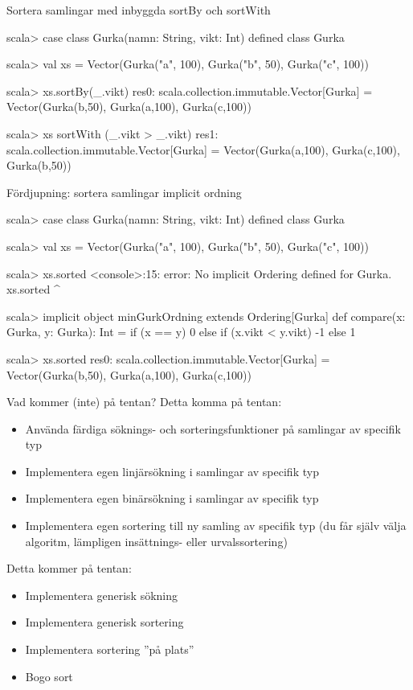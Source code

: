 \begin{Slide}{Sortera samlingar med inbyggda sortBy och sortWith}
\begin{REPL}
scala> case class Gurka(namn: String, vikt: Int)
defined class Gurka

scala> val xs = Vector(Gurka("a", 100), Gurka("b", 50), Gurka("c", 100))

scala> xs.sortBy(_.vikt)
res0: scala.collection.immutable.Vector[Gurka] = 
        Vector(Gurka(b,50), Gurka(a,100), Gurka(c,100))

scala> xs sortWith (_.vikt > _.vikt)
res1: scala.collection.immutable.Vector[Gurka] = 
        Vector(Gurka(a,100), Gurka(c,100), Gurka(b,50))

\end{REPL}
\end{Slide}

        
\begin{Slide}{Fördjupning: sortera samlingar implicit ordning}
\begin{REPL}
scala> case class Gurka(namn: String, vikt: Int)
defined class Gurka

scala> val xs = Vector(Gurka("a", 100), Gurka("b", 50), Gurka("c", 100))

scala> xs.sorted
<console>:15: error: No implicit Ordering defined for Gurka.
       xs.sorted
          ^

scala> implicit object minGurkOrdning extends Ordering[Gurka] {
         def compare(x: Gurka, y: Gurka): Int = 
           if (x == y) 0 
           else if (x.vikt < y.vikt) -1
           else 1
       }

scala> xs.sorted
res0: scala.collection.immutable.Vector[Gurka] = 
        Vector(Gurka(b,50), Gurka(a,100), Gurka(c,100))
\end{REPL}
\end{Slide}


\begin{Slide}{Vad kommer (inte) på tentan?}
Detta  komma på tentan:
\begin{itemize}
\item Använda färdiga söknings- och sorteringsfunktioner på samlingar av specifik typ
\item Implementera egen linjärsökning i samlingar av specifik typ
\item Implementera egen binärsökning i samlingar av specifik typ
\item Implementera egen sortering till ny samling av specifik typ (du får själv välja algoritm, lämpligen insättnings- eller urvalssortering)

\end{itemize}
Detta kommer  på tentan:
\begin{itemize}
\item Implementera generisk sökning 
\item Implementera generisk sortering
\item Implementera sortering ''på plats''
\item Bogo sort
\end{itemize}
\end{Slide}

\fi











